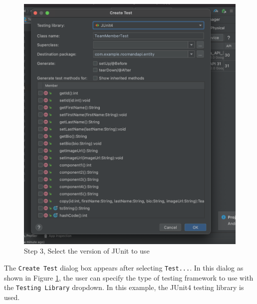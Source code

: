 \documentclass[12pt]{article}
\begin{document}
\begin{figure}[H]
    \centering
    \includegraphics[trim=10 10 10 50, clip, width=\textwidth] {images/testing/3_pick_testing_Framework.png}
    \caption{Step 3, Select the version of JUnit to use}
    \label{fig:test_step_3}
\end{figure}
The \verb|Create Test| dialog box appears after selecting \verb|Test...|. In this dialog as shown in Figure \ref{fig:test_step_3}, the user can specify the type of testing framework to use with the \verb|Testing Library| dropdown. In this example, the JUnit4 testing library is used.
\end{document}
